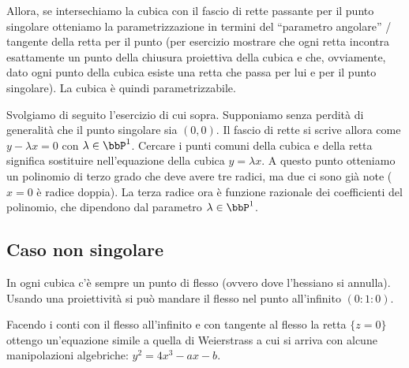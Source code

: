 Allora, se intersechiamo la cubica con il fascio di rette passante per
il punto singolare otteniamo la parametrizzazione in termini del
``parametro angolare'' / tangente della retta per il punto (per esercizio
mostrare che ogni retta incontra esattamente un punto della chiusura
proiettiva della cubica e che, ovviamente, dato ogni punto della cubica
esiste una retta che passa per lui e per il punto singolare). La cubica
è quindi parametrizzabile.

Svolgiamo di seguito l'esercizio di cui sopra.
Supponiamo senza perdità di generalità che il punto singolare sia $(0,
0)$. Il fascio di rette si scrive allora come $y - \lambda x = 0$ con
$\lambda \in \bbP^1$. Cercare i punti comuni della cubica e della retta
significa sostituire nell'equazione della cubica $y = \lambda x$. A
questo punto otteniamo un polinomio di terzo grado che deve avere tre
radici, ma due ci sono già note ($x = 0$ è radice doppia). La terza
radice ora è funzione razionale dei coefficienti del polinomio, che
dipendono dal parametro $\lambda \in \bbP^1$.


\subsection{Caso non singolare}
In ogni cubica c'è sempre un punto di flesso (ovvero dove l'hessiano si
annulla). Usando una proiettività si può mandare il flesso nel punto
all'infinito $(0 : 1 : 0)$.


Facendo i conti con il flesso all'infinito e con tangente al flesso la
retta $\{ z = 0 \}$ ottengo un'equazione simile a quella di Weierstrass
a cui si arriva con alcune manipolazioni algebriche:
$y^2 = 4 x^3 - a x - b$.

